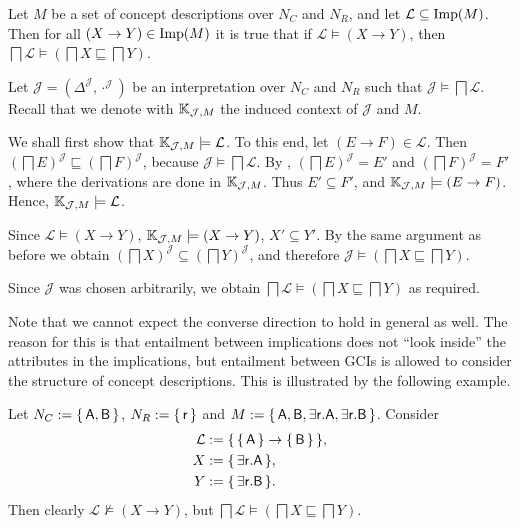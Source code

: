 \begin{Lemma}
  \label{lem:implicational-entailment-implies-gci-entailment}
  Let $M$ be a set of concept descriptions over $N_C$ and $N_R$, and let $\mathcal{L}
  \subseteq \operatorname{Imp}(M)$.  Then for all $(X \to Y) \in \operatorname{Imp}(M)$ it is true that if
  $\mathcal{L} \models (X \to Y)$, then $\bigsqcap \mathcal{L} \models (\bigsqcap X
  \sqsubseteq \bigsqcap Y)$.
\end{Lemma}
\begin{Proof}
  Let $\mathcal{J} = (\Delta^{\mathcal{J}}, \cdot^{\mathcal{J}})$ be an interpretation
  over $N_C$ and $N_R$ such that $\mathcal{J} \models \bigsqcap \mathcal{L}$.  Recall that
  we denote with ${\mathbb{K}}_{\mathcal{J}, M}$ the induced context of $\mathcal{J}$ and $M$.
  
  We shall first show that ${\mathbb{K}}_{\mathcal{J}, M} \models \mathcal{L}$.  To this end,
  let $(E \to F) \in \mathcal{L}$.  Then $(\bigsqcap E)^{\mathcal{J}} \sqsubseteq
  (\bigsqcap F)^{\mathcal{J}}$, because $\mathcal{J} \models \bigsqcap \mathcal{L}$.  By
  , $(\bigsqcap E)^{\mathcal{J}} = E'$ and $(\bigsqcap
  F)^{\mathcal{J}} = F'$, where the derivations are done in ${\mathbb{K}}_{\mathcal{J}, M}$.
  Thus $E' \subseteq F'$, and ${\mathbb{K}}_{\mathcal{J}, M} \models (E \to F)$.  Hence, ${\mathbb{K}}_{\mathcal{J}, M} \models \mathcal{L}$.

  Since $\mathcal{L} \models (X \to Y)$, ${\mathbb{K}}_{\mathcal{J}, M} \models (X \to Y)$, \ie
  $X' \subseteq Y'$.  By the same argument as before we obtain $(\bigsqcap
  X)^{\mathcal{J}} \subseteq (\bigsqcap Y)^{\mathcal{J}}$, and therefore $\mathcal{J}
  \models (\bigsqcap X \sqsubseteq \bigsqcap Y)$.

  Since $\mathcal{J}$ was chosen arbitrarily, we obtain $\bigsqcap \mathcal{L} \models
  (\bigsqcap X \sqsubseteq \bigsqcap Y)$ as required.
\end{Proof}

Note that we cannot expect the converse direction to hold in general as well.  The reason
for this is that entailment between implications does not ``look inside'' the attributes
in the implications, but entailment between GCIs is allowed to consider the structure of
concept descriptions.  This is illustrated by the following example.

\begin{Example}
  \label{expl:gci-entailment-does-not-impliy-implicational-entailment}
  Let $N_C := {\{\, \mathsf{A}, \mathsf{B} \,\}}$, $N_R := {\{\, \mathsf{r} \,\}}$ and $M := {\{\,
    \mathsf{A}, \mathsf{B}, \mathsf{\exists r. A}, \mathsf{\exists r. B} \,\}}$.  Consider
  \begin{align*}
    \mathcal{L} &:= {\{\, {\{\, \mathsf{A} \,\}} \to {\ensuremath{\{\, \mathsf{B} \,\}}} \,\}}, \\
    X &:= {\{\, \mathsf{\exists r. A} \,\}}, \\
    Y &:= {\{\, \mathsf{\exists r. B} \,\}}.
  \end{align*}
  Then clearly $\mathcal{L} \not\models (X \to Y)$, but $\bigsqcap \mathcal{L} \models
  (\bigsqcap X \sqsubseteq \bigsqcap Y)$.
\end{Example}


